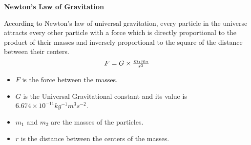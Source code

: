 \begin{center}
\Large{\textbf{\underline{Newton's Law of Gravitation}}}
\end{center}
According to Newton's law of universal gravitation, every particle in the universe attracts every other particle with a force which is directly proportional to the product of their masses and inversely proportional to the square of the distance between their centers.
\begin{equation}
$$ F = G \times \frac{m_1 m_2}{r^2} $$ 
\end{equation}
\begin{itemize}
  \item $F$ is the force between the masses.
  \item $G$ is the Universal Gravitational constant and its value is $6.674 \times 10 ^{-11}  kg^{-1}m^{3}s^{-2}$.
  \item $m_1$ and $m_2$ are the masses of the particles.
  \item $r$ is the distance between the centers of the masses.
\end{itemize}


